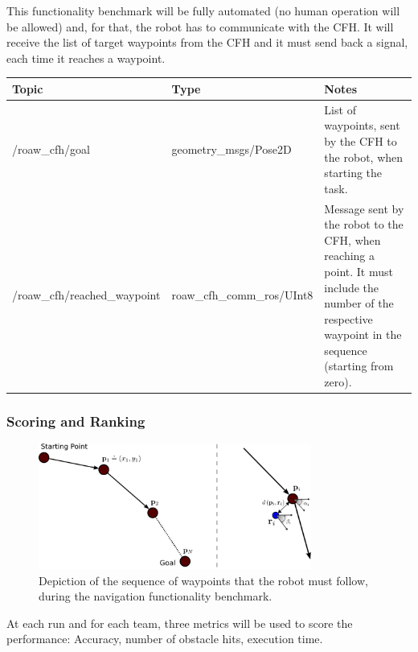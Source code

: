 This functionality benchmark will be fully automated (no human operation will be allowed) and, for that, the robot has to communicate with the CFH. It will receive the list of target waypoints from the CFH and it must send back a signal, each time it reaches a waypoint.
\begin{table}[h]
\centering
\begin{footnotesize}
\begin{tabular}{|l|l|p{5cm}|}
\hline
 Topic	&	Type  	  &	Notes \\ \hline\hline
 /roaw\_cfh/goal & geometry\_msgs/Pose2D & List of waypoints, sent by the CFH to the robot, when starting the task. \\ \hline
 /roaw\_cfh/reached\_waypoint & roaw\_cfh\_comm\_ros/UInt8 & Message sent by the robot to the CFH, when reaching a point. It must include the number of the respective waypoint in the sequence (starting from zero). \\ \hline
\end{tabular}
\end{footnotesize}
\end{table}


\subsubsection{Scoring and Ranking}
\label{sssec:FooOMScoring}

\begin{figure}[t!]
  \centering
  \includegraphics[width=0.8\textwidth]{./fig/FBM/athome/fbm2_navigation/drawing_final.png}
  \caption{Depiction of the sequence of waypoints that the robot must follow, during the navigation functionality benchmark.} \label{fig:navigation_waypoints}
\end{figure}
 
At each run and for each team, three metrics will be used to score the performance: Accuracy, number of obstacle hits, execution time. 


